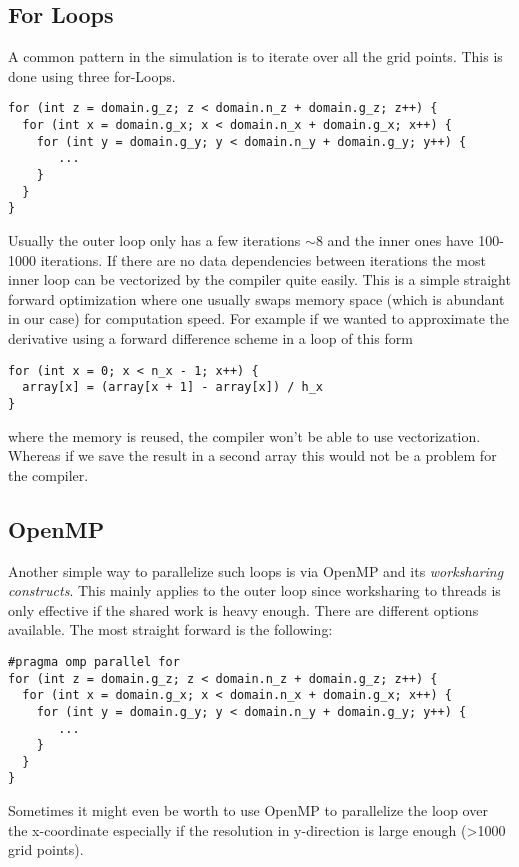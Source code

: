 \documentclass[master.tex]{subfiles}
\begin{document}
\subsection{For Loops}
A common pattern in the simulation is to iterate over all the grid points.
This is done using three for-Loops.
\begin{lstlisting}
for (int z = domain.g_z; z < domain.n_z + domain.g_z; z++) {
  for (int x = domain.g_x; x < domain.n_x + domain.g_x; x++) {
    for (int y = domain.g_y; y < domain.n_y + domain.g_y; y++) {
       ...
    }
  }
}
\end{lstlisting}
Usually the outer loop only has a few iterations $\sim 8$ and the inner ones have 100-1000 iterations.
If there are no data dependencies between iterations the most inner loop can be vectorized by the compiler quite easily. This is a simple straight forward optimization where one usually swaps memory space (which is abundant in our case) for computation speed. For example if we wanted to approximate the derivative using a forward difference scheme in a loop of this form
\begin{lstlisting}
for (int x = 0; x < n_x - 1; x++) {
  array[x] = (array[x + 1] - array[x]) / h_x    
}
\end{lstlisting}
where the memory is reused, the compiler won't be able to use vectorization. Whereas if we save the result in a second array this would not be a problem for the compiler.
\subsection{OpenMP} \label{sec:open-mp-method}
Another simple way to parallelize such loops is via OpenMP and its \textit{worksharing constructs}. This mainly applies to the outer loop since worksharing to threads is only effective if the shared work is heavy enough. There are different options available. The most straight forward is the following:
\begin{lstlisting}
#pragma omp parallel for
for (int z = domain.g_z; z < domain.n_z + domain.g_z; z++) {
  for (int x = domain.g_x; x < domain.n_x + domain.g_x; x++) {
    for (int y = domain.g_y; y < domain.n_y + domain.g_y; y++) {
       ...
    }
  }
}
\end{lstlisting}
\begin{blockquote}
  \small
  Sometimes it might even be worth to use OpenMP to parallelize the loop over the x-coordinate especially if the resolution in y-direction is large enough (\textgreater 1000 grid points).
\end{blockquote}
\end{document}
